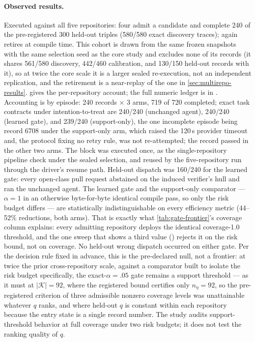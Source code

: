 \paragraph{Observed results.}
Executed against all five repositories: four admit a candidate and complete 240 of the
pre-registered 300 held-out triples (580/580 exact discovery traces); 
again retires at compile time.  This cohort is drawn from the same frozen snapshots with
the same selection seed as the core study and excludes none of its records (it shares
561/580 discovery, 442/460 calibration, and 130/150 held-out records with it), so at twice
the core scale it is a larger sealed re-execution, not an independent replication, and the
 retirement is a near-replay of the one in
\cref{sec:multirepo-results}.   gives the per-repository
account; the full numeric ledger is in
.  Accounting is by episode: 240 records $\times$ 3 arms, 719 of 720 completed; exact task
contracts under intention-to-treat are 240/240 (unchanged agent), 240/240 (learned gate),
and 239/240 (support-only), the one incomplete episode being  record
6708 under the support-only arm, which raised the 120\,s provider timeout and, the protocol
fixing no retry rule, was not re-attempted; the record passed in the other two arms.  The
 block was executed once, as the single-repository pipeline check under
the sealed selection, and reused by the five-repository run through the driver's resume
path.  Held-out dispatch was 160/240 for the learned gate: every open-class pull request
abstained on the induced verifier's  hull and ran the unchanged agent.  The
learned gate and the
support-only comparator --- $\alpha=1$ in an otherwise byte-for-byte identical compile
pass, so only the risk budget differs --- are statistically indistinguishable on every
efficiency metric (44--52\% reductions, both arms).  That is exactly what
\cref{tab:gate-frontier}'s coverage column explains: every admitting repository deploys
the identical coverage-1.0 threshold, and the one sweep that shows a third value
() rejects it on the risk bound, not on coverage.  No held-out
wrong dispatch occurred on either gate.  Per the decision rule fixed in advance, this is
the pre-declared null, not a frontier: at twice the prior cross-repository scale, against
a comparator built to isolate the risk budget specifically, the exact-$\alpha=.05$ gate
remains a support threshold --- as it must at $|\mathcal{K}|=92$, where the registered
bound certifies only $n_\eta=92$, so the pre-registered criterion of three admissible
nonzero coverage levels was unattainable whatever $q$ ranks, and where held-out $q$ is
constant within each repository because the entry state is a single record number.  The
study audits support-threshold behavior at full coverage under two risk budgets; it does
not test the ranking quality of $q$.

